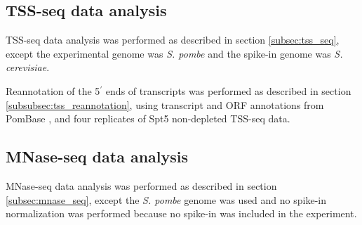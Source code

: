 \subsection{TSS-seq data analysis}

TSS-seq data analysis was performed as described in section \ref{subsec:tss_seq}, except the experimental genome was \textit{S. pombe} and the spike-in genome was \textit{S. cerevisiae}.

Reannotation of the 5$^\prime$ ends of transcripts was performed as described in section \ref{subsubsec:tss_reannotation}, using transcript and ORF annotations from PomBase \citep{lock2018}, and four replicates of Spt5 non-depleted TSS-seq data.

\subsection{MNase-seq data analysis}

MNase-seq data analysis was performed as described in section \ref{subsec:mnase_seq}, except the \textit{S. pombe} genome was used and no spike-in normalization was performed because no spike-in was included in the experiment.

\newpage

\begingroup
    \singlespacing
    
\endgroup
